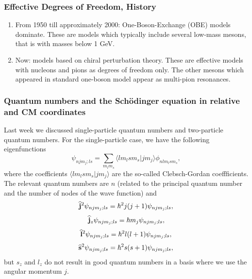 \documentclass[compress]{beamer}
\newcommand{\OP}[1]{{\bf\widehat{#1}}}
\begin{document}




\frame
{
  \frametitle{Effective Degrees of Freedom, History}
\begin{enumerate}
\item From 1950 till approximately 2000: One-Boson-Exchange (OBE) models dominate. These are models which typically include several low-mass mesons, that is with masses below 1 GeV.
\item Now: models based on chiral perturbation theory. These are effective models with nucleons and pions as degrees of freedom only. The other mesons which appeared in standard one-boson model appear as multi-pion resonances. 
\end{enumerate}
}








\frame
{
\frametitle{Quantum numbers and the Sch\"odinger equation in relative and CM coordinates}
\begin{small}
{\scriptsize
Last week we discussed single-particle quantum numbers and two-particle quantum numbers.
For the single-particle case, we have the following eigenfunctions 
\[
\psi_{njm_j;ls}=\sum_{m_lm_s}\langle lm_lsm_s|jm_j\rangle\phi_{nlm_lsm_s},
\]
where the coefficients $\langle lm_lsm_s|jm_j\rangle$ are the so-called Clebsch-Gordan coeffficients.
The relevant quantum numbers are $n$ (related to the principal quantum number and the number of nodes of the wave function) and 
\[
   \OP{j}^2\psi_{njm_j;ls}=\hbar^2j(j+1)\psi_{njm_j;ls},
\]
\[
   \OP{j}_z\psi_{njm_j;ls}=\hbar m_j\psi_{njm_j;ls},
\]
\[
   \OP{l}^2\psi_{njm_j;ls}=\hbar^2l(l+1)\psi_{njm_j;ls},
\]
\[
   \OP{s}^2\psi_{njm_j;ls}=\hbar^2s(s+1)\psi_{njm_j;ls},
\]
but $s_z$ and $l_z$ do not result in good quantum numbers in a basis where we
use the angular momentum $j$.
}
\end{small}
}
\end{document}
